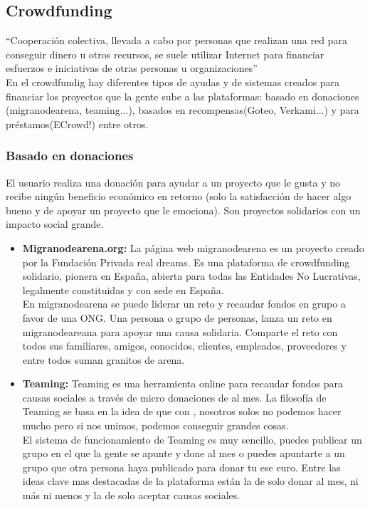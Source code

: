 \subsection{Crowdfunding}
“Cooperación colectiva, llevada a cabo por personas que realizan una red para conseguir dinero u otros recursos, se suele utilizar Internet para financiar esfuerzos e iniciativas de otras personas u organizaciones”\cite{crowd}\\

En el crowdfundig hay diferentes tipos de ayudas y de sistemas creados para financiar los proyectos que la gente sube a las plataformas: basado en donaciones (migranodearena, teaming...), basados en recompensas(Goteo, Verkami...) y para préstamos(ECrowd!) entre otros.

\subsubsection{Basado en donaciones}
El usuario realiza una donación para ayudar a un proyecto que le gusta y no recibe ningún beneficio económico en retorno (solo la satisfacción de hacer algo bueno y de apoyar un proyecto que le emociona). Son proyectos solidarios con un impacto social grande.
\begin{itemize}
	\item \textbf{Migranodearena.org:}\smallbreak
	La página web migranodearena es un proyecto creado por la Fundación Privada real dreams. Es una plataforma de crowdfunding solidario, pionera en España, abierta para todas las Entidades No Lucrativas, legalmente constituidas y con sede en España. \\
	En migranodearena se puede liderar un reto y recaudar fondos en grupo a favor de una ONG. Una persona o grupo de personas, lanza un reto en migranodeareana para apoyar una causa solidaria. Comparte el reto con todos sus familiares, amigos, conocidos, clientes, empleados, proveedores y entre todos suman granitos de arena.
	\item \textbf{Teaming:}\smallbreak
	Teaming es una herramienta online para recaudar fondos para causas sociales a través de micro donaciones de  al mes. La filosofía de Teaming se basa en la idea de que con , nosotros solos no podemos hacer mucho pero si nos unimos, podemos conseguir grandes cosas.\\
	El sistema de funcionamiento de Teaming es muy sencillo, puedes publicar un grupo en el que la gente se apunte y done  al mes o puedes apuntarte a un grupo que otra persona haya publicado para donar tu ese euro. Entre las ideas clave mas destacadas de la plataforma están la de solo donar  al mes, ni más ni menos y la de solo aceptar causas sociales.
\end{itemize}

